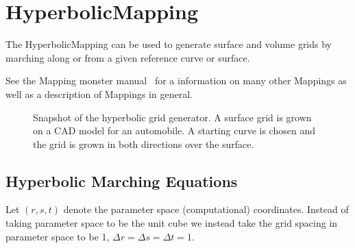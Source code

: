\newcommand{\da}{\Delta a}         %
\newcommand{\das}{\overline{\da}}  %
\newcommand{\xr}{{\bf xr}}
\newcommand{\xs}{{\bf xs}}
\newcommand{\xt}{{\bf xt}}
\newcommand{\xrr}{{\bf xrr}}
\newcommand{\xss}{{\bf xss}}

\newcommand{\ds}{{\bf ds}}
\newcommand{\dss}{{\bf dss}}



\section{HyperbolicMapping}

The HyperbolicMapping can be used to generate surface and volume grids by marching
along or from a given reference curve or surface.
 

See the Mapping monster manual~\cite{MAPPINGS} for a information on many other Mappings
as well as a description of Mappings in general.

{
\newcommand{\figWidthd}{9cm}
\newcommand{\trimfig}[2]{\trimPlot{#1}{#2}{.0}{.0}{.0}{.0}}
\begin{figure}[hbt]
\begin{center}
\end{center}
\caption{Snapshot of the hyperbolic grid generator. A surface grid is grown on a CAD
  model for an automobile. A starting curve is chosen and the grid is grown in both directions
   over the surface.} \label{fig:screenAsmo}
\end{figure}
}


\subsection{Hyperbolic Marching Equations}

\newcommand{\nvhat}{\hat{\nv}}


Let $(r,s,t)$ denote the parameter space (computational) coordinates.
Instead of taking parameter space to be the unit cube we instead take
the grid spacing in parameter space to be 1, $\Delta r = \Delta s =
\Delta t =1$. 

